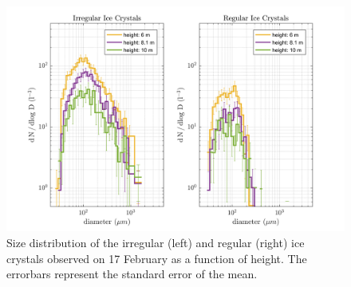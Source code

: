 \documentclass[draft,linenumbers]{agujournal}
\begin{document}
\begin{figure}[t]
 \centering
 	\includegraphics[width=14cm]{1702_habitswSpectrum.png}
 \caption{Size distribution of the irregular (left) and regular (right) ice crystals observed on 17 February as a function of height. The errorbars represent the standard error of the mean.}
 \label{fig:spectrum17}
\end{figure}
\end{document}
